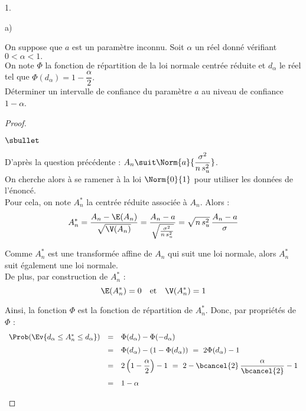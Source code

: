 \begin{noliste}{1.}
\begin{noliste}{a)}
  
  \item On suppose que $a$ est un paramètre inconnu. Soit $\alpha$ un 
  réel donné vérifiant $0 < \alpha < 1.$\\
  On note $\Phi$ la fonction de répartition de la loi normale centrée 
  réduite et $d_\alpha$ le réel tel que $\Phi(d_\alpha) = 
  1-\dfrac{\alpha}{2}.$\\
  Déterminer un intervalle de confiance du paramètre $a$ au niveau de 
  confiance $1-\alpha$.
  
  \begin{proof}~
   \begin{noliste}{$\sbullet$}
    \item D'après la question précédente : $A_n \suit 
    \Norm{a}{\dfrac{\sigma^2}{n \, s_u^2}}$.\\
    On cherche alors à se ramener à la loi $\Norm{0}{1}$ pour 
    utiliser les données de l'énoncé.\\
    Pour cela, on note $A_n^*$ la \var centrée réduite associée à 
    $A_n$. Alors :
    \[
     A_n^* = \dfrac{A_n - \E(A_n)}{\sqrt{\V(A_n)}} = 
     \dfrac{A_n -a}{\sqrt{\frac{\sigma^2}{n \, s_u^2}}}
     = \sqrt{n \, s_u^2} \, \dfrac{A_n - a}{\sigma}
    \]
    
    \item Comme $A_n^*$ est une transformée affine de $A_n$ qui suit
    une loi normale, alors $A_n^*$ suit également une loi normale.\\
    De plus, par construction de $A_n^*$ :
    \[
     \E(A_n^*)=0 \quad \mbox{et} \quad \V(A_n^*)=1 
    \]
    
    \item Ainsi, la fonction $\Phi$ est la fonction de répartition 
    de $A_n^*$. Donc, par propriétés de $\Phi$ :
    \[
     \begin{array}{rcl}
      \Prob(\Ev{d_\alpha \leq A_n^* \leq d_\alpha}) &=& 
      \Phi(d_\alpha) - \Phi(-d_\alpha)
      \\[.2cm]
      &=& \Phi(d_\alpha) -(1- \Phi(d_\alpha)) \ = \
      2 \Phi(d_\alpha) -1
      \\[.2cm]
      &=& 2\left(1- \dfrac{\alpha}{2}\right) -1 \ = \
      2 - \bcancel{2} \, \dfrac{\alpha}{\bcancel{2}} -1
      \\[.4cm]
      &=& 1 - \alpha
     \end{array}
    \]
       

\end{noliste}
\end{proof}
\end{noliste}
\end{noliste}
